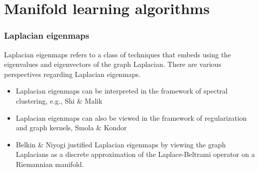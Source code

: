 \documentclass[professionalfonts,hyperref={colorlinks=true,linkcolor=red}]{beamer}
\begin{document}
\section{Manifold learning algorithms}
\begin{frame}
  \frametitle{Laplacian eigenmaps}
  Laplacian eigenmaps refers to a class of techniques
  that embeds using the eigenvalues and eigenvectors of the graph
  Laplacian. There are various perspectives regarding
  Laplacian eigenmaps. 
  \begin{itemize}
  \item<2-> Laplacian eigenmaps can be interpreted in the framework of
    spectral clustering, e.g., Shi \& Malik
    \cite{shi00:_normal_cuts_image_segmen}
  \item<3-> Laplacian eigenmaps can also be viewed in the framework of
    regularization and graph kernels, Smola \& Kondor
    \cite{smola03:_kernel_regul_graph}
  \item<4-> Belkin \& Niyogi \cite{belkin03:_laplac} justified Laplacian
    eigenmaps by viewing the graph Laplacians as a discrete
    approximation of the Laplace-Beltrami operator on a Riemannian
    manifold.  
  \end{itemize}
\end{frame}
\end{document}
